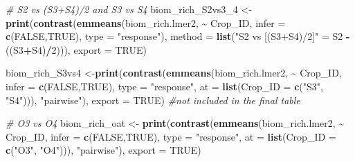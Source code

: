 \documentclass[
]{article}
\newenvironment{Shaded}{\begin{snugshade}}{\end{snugshade}}
\newcommand{\AttributeTok}[1]{\textcolor[rgb]{0.13,0.29,0.53}{#1}}
\newcommand{\CommentTok}[1]{\textcolor[rgb]{0.56,0.35,0.01}{\textit{#1}}}
\newcommand{\ConstantTok}[1]{\textcolor[rgb]{0.56,0.35,0.01}{#1}}
\newcommand{\DecValTok}[1]{\textcolor[rgb]{0.00,0.00,0.81}{#1}}
\newcommand{\FunctionTok}[1]{\textcolor[rgb]{0.13,0.29,0.53}{\textbf{#1}}}
\newcommand{\NormalTok}[1]{#1}
\newcommand{\OtherTok}[1]{\textcolor[rgb]{0.56,0.35,0.01}{#1}}
\newcommand{\SpecialCharTok}[1]{\textcolor[rgb]{0.81,0.36,0.00}{\textbf{#1}}}
\newcommand{\StringTok}[1]{\textcolor[rgb]{0.31,0.60,0.02}{#1}}
\begin{document}
\begin{Shaded}
\begin{Highlighting}[]
\CommentTok{\# S2 vs (S3+S4)/2 and S3 vs S4}
\NormalTok{biom\_rich\_S2vs3\_4 }\OtherTok{\textless{}{-}} \FunctionTok{print}\NormalTok{(}\FunctionTok{contrast}\NormalTok{(}\FunctionTok{emmeans}\NormalTok{(biom\_rich.lmer2, }\SpecialCharTok{\textasciitilde{}}\NormalTok{ Crop\_ID, }
                                            \AttributeTok{infer =} \FunctionTok{c}\NormalTok{(}\ConstantTok{FALSE}\NormalTok{,}\ConstantTok{TRUE}\NormalTok{), }
                                            \AttributeTok{type =} \StringTok{"response"}\NormalTok{),}
                                    \AttributeTok{method =} \FunctionTok{list}\NormalTok{(}\StringTok{"S2 vs [(S3+S4)/2]"} \OtherTok{=}\NormalTok{ S2 }\SpecialCharTok{{-}}\NormalTok{ ((S3}\SpecialCharTok{+}\NormalTok{S4)}\SpecialCharTok{/}\DecValTok{2}\NormalTok{))),}
                           \AttributeTok{export =} \ConstantTok{TRUE}\NormalTok{)}

\NormalTok{biom\_rich\_S3vs4 }\OtherTok{\textless{}{-}}\FunctionTok{print}\NormalTok{(}\FunctionTok{contrast}\NormalTok{(}\FunctionTok{emmeans}\NormalTok{(biom\_rich.lmer2, }\SpecialCharTok{\textasciitilde{}}\NormalTok{ Crop\_ID,}
                                         \AttributeTok{infer =} \FunctionTok{c}\NormalTok{(}\ConstantTok{FALSE}\NormalTok{,}\ConstantTok{TRUE}\NormalTok{),  }
                                         \AttributeTok{type =} \StringTok{"response"}\NormalTok{, }
                                         \AttributeTok{at =} \FunctionTok{list}\NormalTok{(}\AttributeTok{Crop\_ID =} \FunctionTok{c}\NormalTok{(}\StringTok{"S3"}\NormalTok{, }\StringTok{"S4"}\NormalTok{))),  }\StringTok{"pairwise"}\NormalTok{),}
                        \AttributeTok{export =} \ConstantTok{TRUE}\NormalTok{) }\CommentTok{\#not included in the final table}

\CommentTok{\# O3 vs O4}
\NormalTok{biom\_rich\_oat }\OtherTok{\textless{}{-}} \FunctionTok{print}\NormalTok{(}\FunctionTok{contrast}\NormalTok{(}\FunctionTok{emmeans}\NormalTok{(biom\_rich.lmer2, }\SpecialCharTok{\textasciitilde{}}\NormalTok{ Crop\_ID, }
                                        \AttributeTok{infer =} \FunctionTok{c}\NormalTok{(}\ConstantTok{FALSE}\NormalTok{,}\ConstantTok{TRUE}\NormalTok{),}
                                        \AttributeTok{type =} \StringTok{"response"}\NormalTok{,}
                                        \AttributeTok{at =} \FunctionTok{list}\NormalTok{(}\AttributeTok{Crop\_ID =} \FunctionTok{c}\NormalTok{(}\StringTok{"O3"}\NormalTok{, }\StringTok{"O4"}\NormalTok{))), }\StringTok{"pairwise"}\NormalTok{), }
                       \AttributeTok{export =} \ConstantTok{TRUE}\NormalTok{)}


\end{Highlighting}
\end{Shaded}
\end{document}
